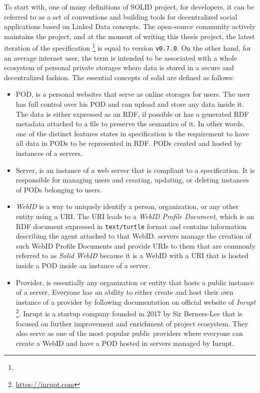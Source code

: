 To start with, one of many definitions of SOLID project, for developers, it can be referred to as a set of conventions and building tools for decentralized social applications based on Linked Data concepts. The open-source community actively maintains the project, and at the moment of writing this thesis project, the latest iteration of the specification \footnote{} is equal to version \texttt{v0.7.0}. On the other hand, for an average internet user, the term \solid{} is intended to be associated with a whole ecosystem of personal private storages where data is stored in a secure and decentralized fashion. The essential concepts of solid are defined as follows:
\begin{itemize}
    \item \solid{} \gls{POD}, is a personal websites that serve as online storages for users. The user has full control over his POD and can upload and store any data inside it. The data is either expressed as an RDF, if possible or has a generated RDF metadata attached to a file to preserve the semantics of it. In other words, one of the distinct features states in \solid{} specification is the requirement to have all data in PODs to be represented in RDF. PODs created and hosted by instances of a \solid{} servers.
    \item \solid{} Server, is an instance of a web server that is compliant to a \solid{} specification. It is responsible for managing users and creating, updating, or deleting instances of PODs belonging to users.
    \item \textit{WebID} is a way to uniquely identify a person, organization, or any other entity using a URI. The URI leads to a \textit{WebID Profile Document}, which is an RDF document expressed in \texttt{text/turtle} format and contains information describing the agent attached to that WebID. \solid{} servers manage the creation of such WebID Profile Documents and provide URIs to them that are commonly referred to as \textit{Solid WebID} because it is a WebID with a URI that is hosted inside a POD inside an instance of a \solid{} server.
    \item \solid{} Provider, is essentially any organization or entity that hosts a public instance of a \solid{} server. Everyone has an ability to either create and host their own instance of a \solid{} provider by following documentation on official website of \textit{Inrupt} \footnote{\url{https://inrupt.com}}. Inrupt is a startup company founded in 2017 by Sir Berners-Lee that is focused on further improvement and enrichment of \solid{} project ecosystem. They also serve as one of the most popular public \solid{} providers where everyone can create a WebID and have a POD hosted in \solid{} servers managed by Inrupt. 
\end{itemize} 

